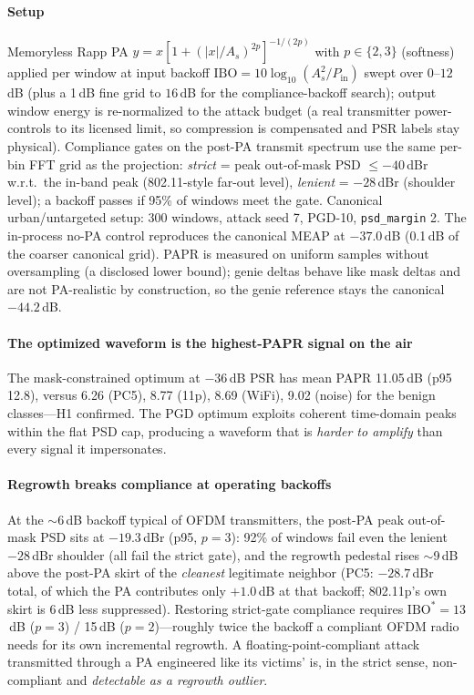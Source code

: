\documentclass[review]{elsarticle}
\begin{document}
\paragraph{Setup} Memoryless Rapp PA $y = x[1+(|x|/A_s)^{2p}]^{-1/(2p)}$
with $p\in\{2,3\}$ (softness) applied per window at input backoff
$\mathrm{IBO}=10\log_{10}(A_s^2/P_{\mathrm{in}})$ swept over
$0$--$12$\,dB (plus a 1\,dB fine grid to $16$\,dB for the
compliance-backoff search); output window energy is re-normalized to the attack budget
(a real transmitter power-controls to its licensed limit, so compression
is compensated and PSR labels stay physical). Compliance gates on the
post-PA transmit spectrum use the same per-bin FFT grid as the
projection: \emph{strict} = peak out-of-mask PSD $\le -40$\,dBr w.r.t.\
the in-band peak (802.11-style far-out level), \emph{lenient} =
$-28$\,dBr (shoulder level); a backoff passes if 95\% of windows meet the
gate. Canonical urban/untargeted setup: 300 windows, attack seed 7,
PGD-10, \texttt{psd\_margin} 2. The in-process no-PA control reproduces
the canonical MEAP at $-37.0$\,dB (0.1\,dB of the coarser canonical grid).
PAPR is measured on uniform samples without oversampling (a disclosed
lower bound); genie deltas behave like mask deltas and are not PA-realistic
by construction, so the genie reference stays the canonical $-44.2$\,dB.

\paragraph{The optimized waveform is the highest-PAPR signal on the air}
The mask-constrained optimum at $-36$\,dB PSR has mean PAPR
11.05\,dB (p95 12.8), versus 6.26 (PC5), 8.77 (11p), 8.69 (WiFi), 9.02
(noise) for the benign classes---H1 confirmed. The PGD optimum exploits
coherent time-domain peaks within the flat PSD cap, producing a waveform
that is \emph{harder to amplify} than every signal it impersonates.

\paragraph{Regrowth breaks compliance at operating backoffs} At the
$\sim$6\,dB backoff typical of OFDM transmitters, the post-PA peak
out-of-mask PSD sits at $-19.3$\,dBr (p95, $p{=}3$): 92\% of windows
fail even the lenient $-28$\,dBr shoulder (all fail the strict gate),
and the regrowth pedestal rises $\sim$9\,dB above the post-PA skirt of
the \emph{cleanest} legitimate neighbor (PC5: $-28.7$\,dBr total, of
which the PA contributes only $+1.0$\,dB at that backoff; 802.11p's own
skirt is $6$\,dB less suppressed). Restoring strict-gate compliance
requires
$\mathrm{IBO}^{*}=13$\,dB ($p{=}3$) / 15\,dB ($p{=}2$)---roughly twice
the backoff a compliant OFDM radio needs for its own incremental
regrowth. A floating-point-compliant attack transmitted through a
PA engineered like its victims' is, in the strict sense, non-compliant
and \emph{detectable as a regrowth outlier}.
\end{document}

